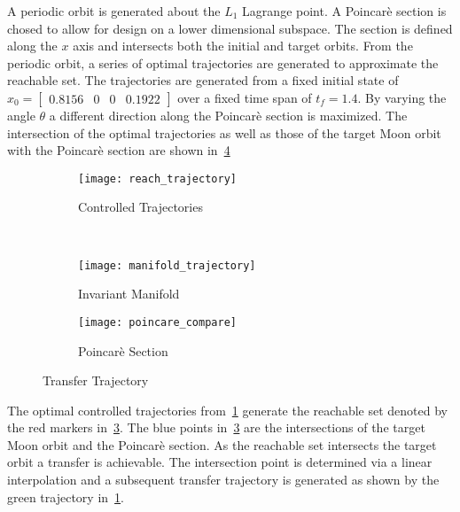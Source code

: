 \documentclass[letterpaper, preprint, paper,11pt]{AAS}	%
\begin{document}
A periodic orbit is generated about the \( L_1 \) Lagrange point. 
A Poincar\`e section is chosed to allow for design on a lower dimensional subspace.
The section is defined along the \( x \) axis and intersects both the initial and target orbits.
From the periodic orbit, a series of optimal trajectories are generated to approximate the reachable set.
The trajectories are generated from a fixed initial state of \( x_0 = \begin{bmatrix}0.8156 & 0 & 0 & 0.1922 \end{bmatrix} \) over a fixed time span of \( t_f = 1.4 \).
By varying the angle \( \theta\) a different direction along the Poincar\`e section is maximized. 
The intersection of the optimal trajectories as well as those of the target Moon orbit with the Poincar\`e section are shown in~\cref{fig:transfer_orbit}
\begin{figure} 
	\centering 
	\begin{subfigure}[htbp]{0.5\textwidth} 
		\texttt{[image: reach\_trajectory]} 
		\caption{Controlled Trajectories} \label{fig:reach_trajectory} 
	\end{subfigure}~ %
	\begin{subfigure}[htbp]{0.5\textwidth} 
		\texttt{[image: manifold\_trajectory]} 
		\caption{Invariant Manifold} \label{fig:manifold_trajectory} 
	\end{subfigure} 
	
	\begin{subfigure}[htbp]{0.5\textwidth} 
		\texttt{[image: poincare\_compare]} 
		\caption{Poincar\`e Section} \label{fig:poincare_compare} 
	\end{subfigure} 
	\caption{Transfer Trajectory}
	\label{fig:transfer_orbit} 
\end{figure}
The optimal controlled trajectories from~\cref{fig:reach_trajectory} generate the reachable set denoted by the red markers in~\cref{fig:poincare_compare}.
The blue points in~\cref{fig:poincare_compare} are the intersections of the target Moon orbit and the Poincar\`e section.
As the reachable set intersects the target orbit a transfer is achievable.
The intersection point is determined via a linear interpolation and a subsequent transfer trajectory is generated as shown by the green trajectory in~\cref{fig:reach_trajectory}.
\end{document}
